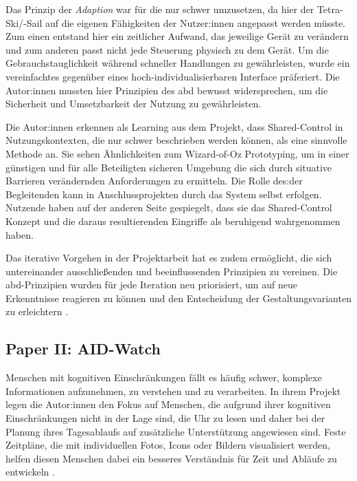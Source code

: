 \documentclass[sigchi-a,screen,nonacm,language=german]{acmart}
\theoremstyle{acmdefinition}
\begin{document}

Das Prinzip der \emph{Adaption} war für die \citet{alsaleem:2020:adaptive-outdoor-activities} nur schwer umzusetzen, da hier der Tetra-Ski/-Sail auf die eigenen Fähigkeiten der Nutzer:innen angepasst werden müsste. Zum einen entstand hier ein zeitlicher Aufwand, das jeweilige Gerät zu verändern und zum anderen passt nicht jede Steuerung physisch zu dem Gerät. Um die Gebrauchstauglichkeit während schneller Handlungen zu gewährleisten, wurde ein vereinfachtes gegenüber eines hoch-individualisierbaren Interface präferiert. Die Autor:innen mussten hier Prinzipien des \ac{abd} bewusst widersprechen, um die Sicherheit und Umsetzbarkeit der Nutzung zu gewährleisten.



Die Autor:innen erkennen als Learning aus dem Projekt, dass Shared-Control in Nutzungskontexten, die nur schwer beschrieben werden können, als eine sinnvolle Methode an. Sie sehen Ähnlichkeiten zum Wizard-of-Oz Prototyping, um in einer günstigen und für alle Beteiligten sicheren Umgebung die sich durch situative Barrieren verändernden Anforderungen zu ermitteln. Die Rolle des:der Begleitenden kann in Anschlussprojekten durch das System selbst erfolgen. Nutzende haben \citet{alsaleem:2020:adaptive-outdoor-activities} auf der anderen Seite gespiegelt, dass sie das Shared-Control Konzept und die daraus resultierenden Eingriffe als beruhigend wahrgenommen haben.

Das iterative Vorgehen in der Projektarbeit hat es zudem ermöglicht, die sich untereinander ausschließenden und beeinflussenden Prinzipien zu vereinen. Die \ac{abd}-Prinzipien wurden für jede Iteration neu priorisiert, um auf neue Erkenntnisse reagieren zu können und den Entscheidung der Gestaltungsvarianten zu erleichtern \citet[vgl.][S.~8]{alsaleem:2020:adaptive-outdoor-activities}.


\subsection{Paper II: AID-Watch}
\label{sec:vorstellung:lit-2}

Menschen mit kognitiven Einschränkungen fällt es häufig schwer, komplexe Informationen aufzunehmen, zu verstehen und zu verarbeiten. %
In ihrem Projekt legen die Autor:innen den Fokus auf Menschen, die aufgrund ihrer kognitiven Einschränkungen nicht in der Lage sind, die Uhr zu lesen und daher bei der Planung ihres Tagesablaufs auf zusätzliche Unterstützung angewiesen sind. Feste Zeitpläne, die mit individuellen Fotos, Icons oder Bildern visualisiert werden, helfen diesen Menschen dabei ein besseres Verständnis für Zeit und Abläufe zu entwickeln \citep{Schneider:2022:Aid-watch}.
\end{document}
